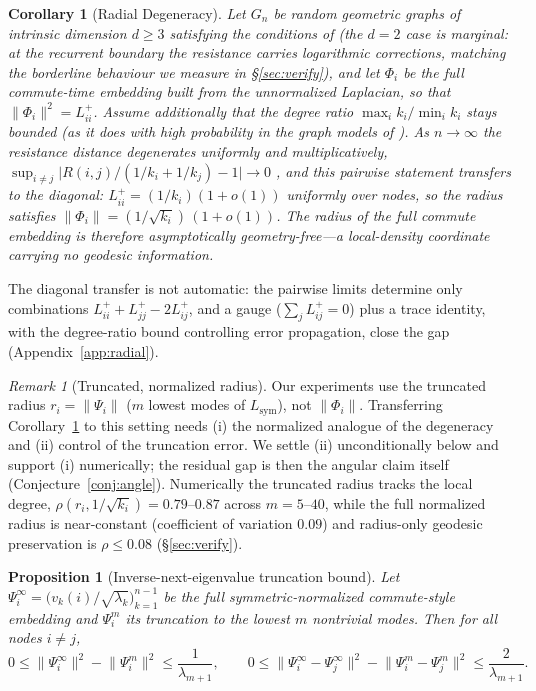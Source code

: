 \documentclass[11pt]{article}
\newtheorem{corollary}[theorem]{Corollary}
\newtheorem{proposition}[theorem]{Proposition}
\theoremstyle{remark}
\newtheorem*{remark}{Remark}
\begin{document}
\begin{corollary}[Radial Degeneracy]\label{thm:radial}
Let $G_n$ be random geometric graphs of intrinsic dimension $d\ge3$ satisfying
the conditions of \cite{vonluxburg2014} (the $d=2$ case is marginal: at the
recurrent boundary the resistance carries logarithmic corrections, matching the
borderline behaviour we measure in \S\ref{sec:verify}), and let $\Phi_i$ be the
\emph{full} commute-time embedding built from the unnormalized Laplacian, so that
$\lVert\Phi_i\rVert^2 = L^{+}_{ii}$. Assume additionally that the degree
ratio $\max_i k_i/\min_i k_i$ stays bounded (as it does with high probability in
the graph models of \cite{vonluxburg2014}). As $n\to\infty$ the resistance
distance degenerates uniformly and multiplicatively,
$\sup_{i\ne j}\big|R(i,j)/(1/k_i+1/k_j)-1\big|\to0$ \cite{vonluxburg2014},
and this pairwise statement transfers to the diagonal:
$L^{+}_{ii}{}=(1/k_i)(1+o(1))$ uniformly over nodes, so the radius
satisfies $\lVert\Phi_i\rVert = (1/\sqrt{k_i})\,(1+o(1))$. The radius of the full
commute embedding is therefore asymptotically geometry-free---a local-density
coordinate carrying no geodesic information.
\end{corollary}

\noindent The diagonal transfer is not automatic: the pairwise limits determine
only combinations $L^+_{ii}+L^+_{jj}-2L^+_{ij}$, and a gauge ($\sum_j L^+_{ij}=0$)
plus a trace identity, with the degree-ratio bound controlling error propagation,
close the gap (Appendix~\ref{app:radial}).

\begin{remark}[Truncated, normalized radius]
Our experiments use the truncated radius $r_i=\lVert\Psi_i\rVert$ ($m$ lowest
modes of $L_{\mathrm{sym}}$), not $\lVert\Phi_i\rVert$. Transferring
Corollary~\ref{thm:radial} to this setting needs (i) the normalized analogue of
the degeneracy \cite{vonluxburg2014} and (ii) control of the truncation error.
We settle (ii) unconditionally below and support (i) numerically; the residual
gap is then the angular claim itself (Conjecture~\ref{conj:angle}).
Numerically the truncated radius tracks the local degree,
$\rho(r_i,1/\sqrt{k_i})=0.79$--$0.87$ across $m=5$--$40$, while the full
normalized radius is near-constant (coefficient of variation $0.09$) and
radius-only geodesic preservation is $\rho\le0.08$ (\S\ref{sec:verify}).
\end{remark}

\begin{proposition}[Inverse-next-eigenvalue truncation bound]\label{prop:trunc}
Let $\Psi^{\infty}_i=\big(v_k(i)/\sqrt{\lambda_k}\big)_{k=1}^{n-1}$ be the full
symmetric-normalized commute-style embedding and $\Psi^{m}_i$ its truncation to
the lowest $m$ nontrivial modes. Then for all nodes $i\neq j$,
\[
0 \le \lVert\Psi^{\infty}_i\rVert^2 - \lVert\Psi^{m}_i\rVert^2
   \le \frac{1}{\lambda_{m+1}},
\qquad
0 \le \lVert\Psi^{\infty}_i-\Psi^{\infty}_j\rVert^2
     - \lVert\Psi^{m}_i-\Psi^{m}_j\rVert^2 \le \frac{2}{\lambda_{m+1}} .
\]
\end{proposition}
\end{document}
